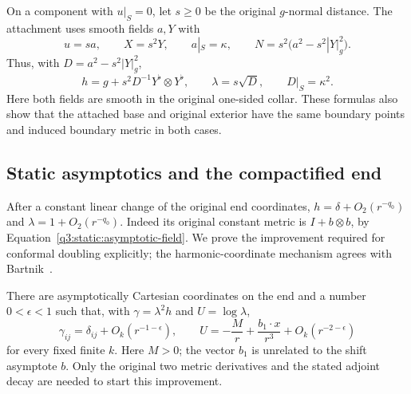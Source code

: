 On a component with \(u|_S=0\), let \(s\geq0\) be the original
\(g\)-normal distance. The attachment uses smooth fields \(a,Y\) with
\begin{equation}
\label{q3:static:double-norm}
u=sa,\qquad X=s^2Y,\qquad a|_S=\kappa,\qquad
N=s^2\bigl(a^2-s^2|Y|_g^2\bigr).
\end{equation}
Thus, with \(D=a^2-s^2|Y|_g^2\),
\[
h=g+s^2D^{-1}Y^\flat\otimes Y^\flat,\qquad
\lambda=s\sqrt D,\qquad D|_S=\kappa^2.
\]
Here both fields are smooth in the original one-sided collar.
These formulas also show that the attached base and original exterior
have the same boundary points and induced boundary metric in both cases.

\subsection{Static asymptotics and the compactified end}
\label{q3:static:asymptotic-subsection}

After a constant linear change of the original end coordinates,
\(h=\delta+O_2(r^{-q_0})\) and
\(\lambda=1+O_2(r^{-q_0})\).
Indeed its original constant metric is
\(I+b\otimes b\), by Equation~\eqref{q3:static:asymptotic-field}.
We prove the improvement required for conformal doubling explicitly;
the harmonic-coordinate mechanism agrees with
Bartnik~\cite[Theorem 3.1, Proposition 3.3, and Theorem 4.3]{Bartnik1986}.

\begin{lemma}
\label{q3:static:asymptotics}
There are asymptotically Cartesian coordinates on the end and a
number \(0<\epsilon<1\) such that, with
\(\gamma=\lambda^2h\) and \(U=\log\lambda\),
\begin{equation}
\label{q3:static:gamma-expansion}
\gamma_{ij}=\delta_{ij}+O_k(r^{-1-\epsilon}),\qquad
U=-\frac Mr+\frac{b_1\cdot x}{r^3}
       +O_k(r^{-2-\epsilon})
\end{equation}
for every fixed finite \(k\).
Here \(M>0\); the vector \(b_1\) is unrelated to the shift asymptote
\(b\).
Only the original two metric derivatives and the stated adjoint
decay are needed to start this improvement.
\end{lemma}

